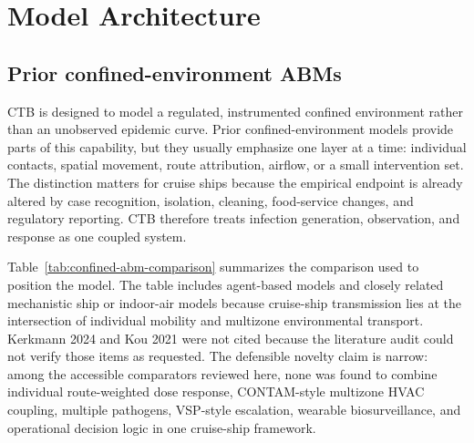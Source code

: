 \chapter{Model Architecture}

\section{Prior confined-environment ABMs}
CTB is designed to model a regulated, instrumented confined environment rather than an unobserved epidemic curve. Prior confined-environment models provide parts of this capability, but they
usually emphasize one layer at a time: individual contacts, spatial movement, route attribution, airflow, or a small intervention set. The distinction matters for cruise ships because the
empirical endpoint is already altered by case recognition, isolation, cleaning, food-service changes, and regulatory reporting. CTB therefore treats infection generation, observation, and
response as one coupled system.

Table~\ref{tab:confined-abm-comparison} summarizes the comparison used to position the model. The table includes agent-based models and closely related mechanistic ship or indoor-air models
because cruise-ship transmission lies at the intersection of individual mobility and multizone environmental transport. Kerkmann 2024 and Kou 2021 were not cited because the literature audit
could not verify those items as requested. The defensible novelty claim is narrow: among the accessible comparators reviewed here, none was found to combine individual route-weighted dose
response, CONTAM-style multizone HVAC coupling, multiple pathogens, VSP-style escalation, wearable biosurveillance, and operational decision logic in one cruise-ship framework.

